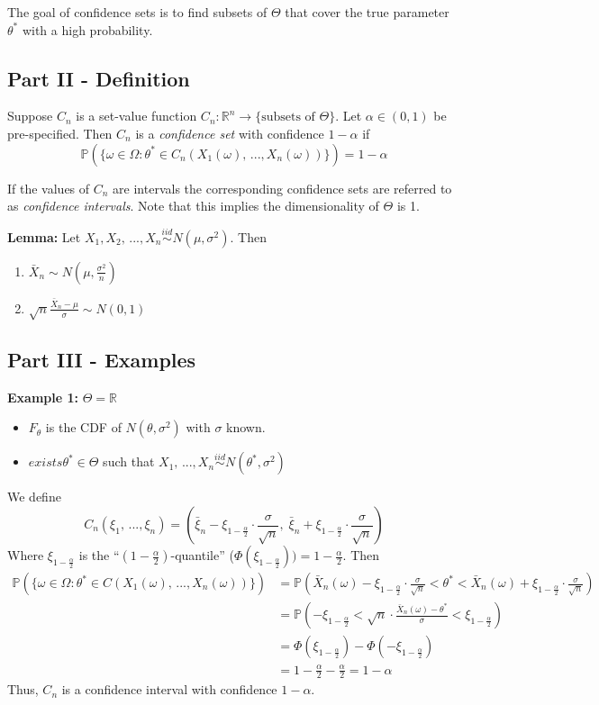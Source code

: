 \documentclass[12pt]{article}
\renewcommand{\P}{\mathbb{P}}
\newcommand{\R}{\mathbb{R}}
\begin{document}
The goal of confidence sets is to find subsets of $\Theta$ that cover the true parameter $\theta^*$ with a high probability. 

\subsection*{Part II - Definition}
Suppose $C_n$ is a set-value function $C_n : \R^n \to \{\text{subsets of } \Theta\}$. Let $\alpha \in (0, 1)$ be pre-specified. Then $C_n$ is a \emph{confidence set} with confidence $1 - \alpha$ if 
\[\P(\{\omega \in \Omega: \theta^* \in C_n(X_1(\omega), \, ..., X_n(\omega))\}) = 1 - \alpha\]

If the values of $C_n$ are intervals the corresponding confidence sets are referred to as \emph{confidence intervals}. Note that this implies the dimensionality of $\Theta$ is 1. 

\textbf{Lemma:} Let $X_1, X_2, \, ..., X_n \overset{iid}{\sim} N(\mu, \sigma^2)$. Then 
\begin{enumerate}
    \item $\bar{X}_n \sim N(\mu, \frac{\sigma^2}{n})$
    \item $\sqrt{n} \frac{\bar{X}_n - \mu}{\sigma} \sim N(0, 1)$
\end{enumerate}

\subsection*{Part III - Examples}
\textbf{Example 1:} $\Theta = \R$ 
\begin{itemize}
    \item $F_\theta$ is the CDF of $N(\theta, \sigma^2)$ with $\sigma$ known.
    \item $exists \theta^* \in \Theta$ such that $X_1, \, ..., X_n \overset{iid}{\sim} N(\theta^*, \sigma^2)$
\end{itemize}
We define 
\[C_n(\xi_1, \,..., \xi_n) = \left(\bar \xi_n - \xi_{1 - \frac{\alpha}{2}} \cdot \frac{\sigma}{\sqrt{n}}, \; \bar{\xi}_n + \xi_{1 - \frac{\alpha}{2}} \cdot \frac{\sigma}{\sqrt{n}}\right)\]
Where $\xi_{1 - \frac{\alpha}{2}}$ is the ``$(1- \frac{\alpha}{2})$-quantile'' ($\Phi(\xi_{1 - \frac{\alpha}{2}})) = 1 - \frac{\alpha}{2}$. Then 
\begin{align*}
    \P\left(\{\omega \in \Omega: \theta^* \in C(X_1(\omega),\, ..., X_n(\omega))\}\right) &= \P\left(\bar{X}_n(\omega) - \xi_{1 - \frac{\alpha}{2}} \cdot \frac{\sigma}{\sqrt{n}} < \theta^* < \bar{X}_n(\omega) + \xi_{1 - \frac{\alpha}{2}} \cdot \frac{\sigma}{\sqrt{n}}\right)\\
    &= \P\left(-\xi_{1 - \frac{\alpha}{2}} < \sqrt{n} \cdot \frac{\bar X_n(\omega) - \theta^*}{\sigma} < \xi_{1 - \frac{\alpha}{2}}\right)\\
    &= \Phi(\xi_{1 - \frac{\alpha}{2}}) - \Phi(-\xi_{1 - \frac{\alpha}{2}})\\
    &= 1 - \frac{\alpha}{2} - \frac{\alpha}{2} = \boxed{1 - \alpha}
\end{align*}
Thus, $C_n$ is a confidence interval with confidence $1 - \alpha$. 
\end{document}
